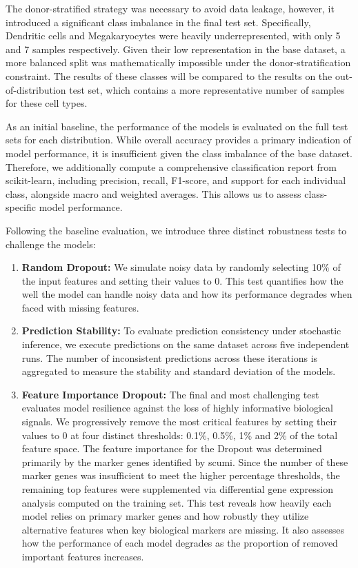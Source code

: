 \documentclass[11pt]{article}
\begin{document}
The donor-stratified strategy was necessary to avoid data leakage, however, it introduced a significant class imbalance in the final test set. Specifically, Dendritic cells and Megakaryocytes were heavily underrepresented, with only 5 and 7 samples respectively. Given their low representation in the base dataset, a more balanced split was mathematically impossible under the donor-stratification constraint. The results of these classes will be compared to the results on the out-of-distribution test set, which contains a more representative number of samples for these cell types.

As an initial baseline, the performance of the models is evaluated on the full test sets for each distribution. While overall accuracy provides a primary indication of model performance, it is insufficient given the class imbalance of the base dataset. Therefore, we additionally compute a comprehensive classification report from scikit-learn, including precision, recall, F1-score, and support for each individual class, alongside macro and weighted averages. This allows us to assess class-specific model performance.

Following the baseline evaluation, we introduce three distinct robustness tests to challenge the models:

\begin{enumerate}
    \item \textbf{Random Dropout:} We simulate noisy data by randomly selecting 10\% of the input features and setting their values to 0. This test quantifies how the well the model can handle noisy data and how its performance degrades when faced with missing features.
    \item \textbf{Prediction Stability:} To evaluate prediction consistency under stochastic inference, we execute predictions on the same dataset across five independent runs. The number of inconsistent predictions across these iterations is aggregated to measure the stability and standard deviation of the models.
    \item \textbf{Feature Importance Dropout:} The final and most challenging test evaluates model resilience against the loss of highly informative biological signals. We progressively remove the most critical features by setting their values to 0 at four distinct thresholds: 0.1\%, 0.5\%, 1\% and 2\% of the total feature space. The feature importance for the Dropout was determined primarily by the marker genes identified by scumi. Since the number of these marker genes was insufficient to meet the higher percentage thresholds, the remaining top features were supplemented via differential gene expression analysis computed on the training set. This test reveals how heavily each model relies on primary marker genes and how robustly they utilize alternative features when key biological markers are missing. It also assesses how the performance of each model degrades as the proportion of removed important features increases.
\end{enumerate}
\end{document}
